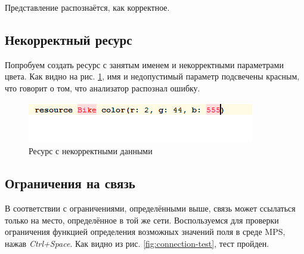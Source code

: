 		
		
		
		
		
		
		
		
		
		Представление распознаётся, как корректное.
		
		\subsection{Некорректный ресурс}
			Попробуем создать ресурс с занятым именем и некорректными параметрами цвета. Как видно на рис. \ref{fig:resource-test}, имя и недопустимый параметр подсвечены красным, что говорит о том, что анализатор распознал ошибку.
		
			\begin{figure}[th]
				\centering
				\includegraphics[width=0.7\linewidth]{images/test-project/resource}
				\caption{Ресурс с некорректными данными}
				\label{fig:resource-test}
			\end{figure}
	
		\subsection{Ограничения на связь}
			В соответствии с ограничениями, определёнными выше, связь может ссылаться только на место, определённое в той же сети. Воспользуемся для проверки ограничения функцией определения возможных значений поля в среде MPS, нажав \textit{Ctrl+Space}. Как видно из рис. \ref{fig:connection-test}, тест пройден.
			
